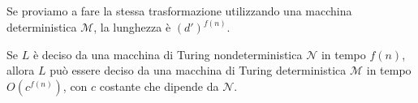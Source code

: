 Se proviamo a fare la stessa trasformazione utilizzando una macchina deterministica $\mathcal{M}$, la lunghezza è $(d')^{f(n)}$.
\begin{center}
\end{center}
\begin{theorem}
    Se $L$ è deciso da una macchina di Turing nondeterministica $\mathcal{N}$ in tempo $f(n)$, allora $L$ può essere deciso da una macchina di Turing deterministica $\mathcal{M}$ in tempo $O(c^{f(n)})$, con $c$ costante che dipende da $\mathcal{N}$.
\end{theorem}
